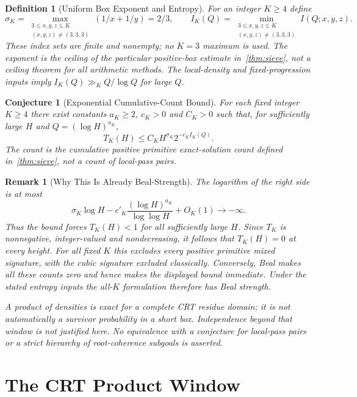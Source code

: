 \documentclass[11pt,a4paper]{article}
\newtheorem{conjecture}[theorem]{Conjecture}
\newtheorem{definition}[theorem]{Definition}
\newtheorem{remark}[theorem]{Remark}
\begin{document}
\begin{definition}[Uniform Box Exponent and Entropy]
\label{def:sigmaK}
For an integer $K\ge4$ define
\[
 \sigma_K=\max_{\substack{3\le x,y,z\le K\\(x,y,z)\ne(3,3,3)}}
                       (1/x+1/y)=2/3,\qquad
 I_K(Q)=\min_{\substack{3\le x,y,z\le K\\(x,y,z)\ne(3,3,3)}}
                       I(Q;x,y,z).
\]
These index sets are finite and nonempty; no $K=3$ maximum is used.
The exponent is the ceiling of the particular positive-box estimate
in~\cref{thm:sieve}, not a ceiling theorem for all arithmetic methods.
The local-density and fixed-progression inputs imply
$I_K(Q)\gg_K Q/\log Q$ for large $Q$.
\end{definition}

\begin{conjecture}[Exponential Cumulative-Count Bound]
\label{conj:exp}
For each fixed integer $K\ge4$ there exist constants $a_K\ge2$,
$c_K>0$ and $C_K>0$ such that, for sufficiently large $H$ and
$Q=(\log H)^{a_K}$,
\[
 T_K(H)\le C_K H^{\sigma_K}2^{-c_K I_K(Q)}.
\]
The count is the cumulative positive primitive exact-solution count
defined in~\cref{thm:sieve}, not a count of local-pass pairs.
\end{conjecture}

\begin{remark}[Why This Is Already Beal-Strength]
The logarithm of the right side is at most
\[
 \sigma_K\log H-c'_K
       \frac{(\log H)^{a_K}}{\log\log H}+O_K(1)\longrightarrow-\infty.
\]
Thus the bound forces $T_K(H)<1$ for all sufficiently large $H$.
Since $T_K$ is nonnegative, integer-valued and nondecreasing,
it follows that $T_K(H)=0$ at \emph{every} height.
For all fixed $K$ this excludes every positive primitive mixed
signature, with the cubic signature excluded classically.
Conversely, Beal makes all these counts zero and hence makes the
displayed bound immediate. Under the stated entropy inputs the
all-$K$ formulation therefore has Beal strength.

A product of densities is exact for a complete CRT residue domain;
it is not automatically a survivor probability in a short box.
Independence beyond that window is not justified here.
No equivalence with a conjecture for local-pass pairs or a strict
hierarchy of root-coherence subgoals is asserted.
\end{remark}

\section{The CRT Product Window}
\label{sec:crt-window}
\end{document}
